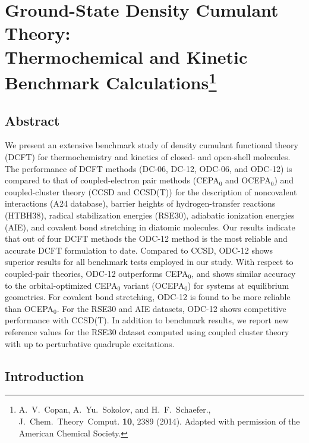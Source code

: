 \chapter[%
	Ground-State Density Cumulant Theory:\\
	Thermochemical and Kinetic Benchmark Calculations
]{%
	Ground-State Density Cumulant Theory:\\
	Thermochemical and Kinetic Benchmark Calculations\footnote{%
        A.~V.~Copan, A.~Yu.~Sokolov, and H.~F.~Schaefer.,
        J.~Chem.~Theory~Comput.
        {\bfseries 10},
        2389
        (2014).
        Adapted with permission of the American Chemical Society.
    }
}
\label{ch:benchmark}

\section{Abstract}
We present an extensive benchmark study of density cumulant functional theory
(DCFT) for thermochemistry and kinetics of closed- and open-shell molecules. The
performance of DCFT methods (DC-06, DC-12, ODC-06, and ODC-12) is compared to
that of coupled-electron pair methods (CEPA$_0$ and OCEPA$_0$) and
coupled-cluster theory (CCSD and CCSD(T)) for the description of noncovalent
interactions (A24 database), barrier heights of hydrogen-transfer reactions
(HTBH38), radical stabilization energies (RSE30), adiabatic ionization energies
(AIE), and covalent bond stretching in diatomic molecules. Our results indicate
that out of four DCFT methods the ODC-12 method is the most reliable and
accurate DCFT formulation to date. Compared to CCSD, ODC-12 shows superior
results for all benchmark tests employed in our study. With respect to
coupled-pair theories, ODC-12 outperforms CEPA$_0$, and shows similar accuracy
to the orbital-optimized CEPA$_0$ variant (OCEPA$_0$) for systems at equilibrium
geometries. For covalent bond stretching, ODC-12 is found to be more reliable
than OCEPA$_0$. For the RSE30 and AIE datasets, ODC-12 shows competitive
performance with CCSD(T). In addition to benchmark results, we report new
reference values for the RSE30 dataset computed using coupled cluster theory
with up to perturbative quadruple excitations.


\section{Introduction}

